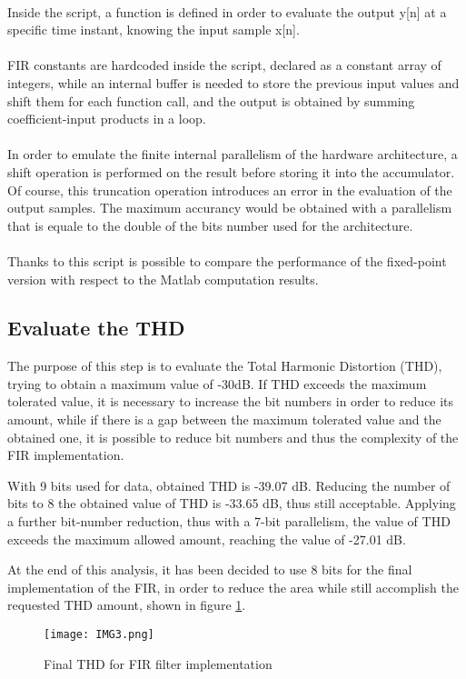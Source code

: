 \paragraph{}
Inside the script, a function is defined in order to evaluate the output y[n] at a specific time instant, knowing the input sample x[n].
\paragraph{}
FIR constants are hardcoded inside the script, declared as a constant array of integers, while an internal buffer is needed to store the previous input values and shift them for each function call, and the output is obtained by summing coefficient-input products in a loop.
\paragraph{}
In order to emulate the finite internal parallelism of the hardware architecture, a shift operation is performed on the result before storing it into the accumulator.
Of course, this truncation operation introduces an error in the evaluation of the output samples.
The maximum accurancy would be obtained with a parallelism that is equale to the double of the bits number used for the architecture.

\paragraph{}
Thanks to this script is possible to compare the performance of the fixed-point version with respect to 
the Matlab computation results.

\subsection{Evaluate the THD}

The purpose of this step is to evaluate the Total Harmonic Distortion (THD), trying to obtain a maximum 
value of -30dB. 
If THD exceeds the maximum tolerated value, it is necessary to increase 
the bit numbers in order to reduce its amount, while if there is a gap between the maximum tolerated value 
and the obtained one, it is possible to reduce bit numbers and thus the complexity of the FIR implementation.


With 9 bits used for data, obtained THD is -39.07 dB. 
Reducing the number of bits to 8 the obtained value of THD  
is -33.65 dB, thus still acceptable. 
Applying a further bit-number reduction, thus with a 7-bit parallelism, the value of THD exceeds the maximum allowed
amount, reaching the value of -27.01 dB.

At the end of this analysis, it has been decided to use 8 bits for the final implementation of the  FIR, 
in order to reduce the area while still accomplish the requested THD amount, shown in figure \ref{fig:3}.
\begin{figure}[!h]
	\caption{Final THD for FIR filter implementation}
	\label{fig:3}
	\texttt{[image: IMG3.png]}
	\centering
\end{figure}

